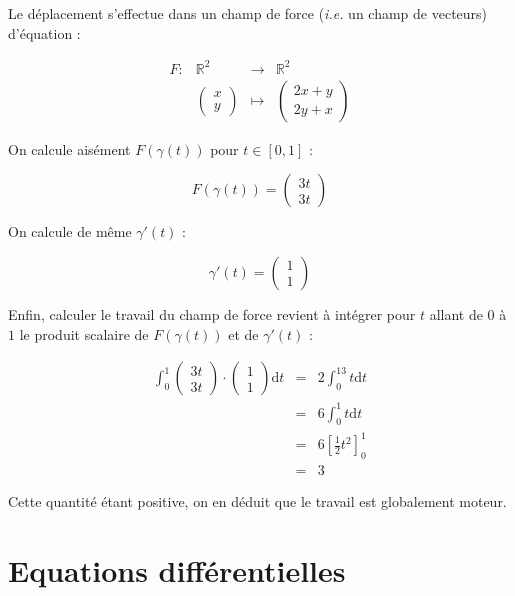 \documentclass[a4paper, 11pt]{report} %
\newcommand{\dt}{\mathrm{d}t}
\newcommand{\R}{\mathbb{R}}
\renewcommand{\mapsto}{\longmapsto}
\begin{document}
Le déplacement s'effectue dans un champ de force (\textit{i.e.} un champ de vecteurs) d'équation :

\[
\begin{array}{llll}
    F : & \R^2 & \longrightarrow & \R^2\\
    & \begin{pmatrix}
        x\\
        y
      \end{pmatrix} & \mapsto &
      \begin{pmatrix}
        2x+y\\
        2y+x
      \end{pmatrix}
\end{array}
\]

On calcule aisément $F(\gamma(t))$ pour $t\in[0,1]$ :

\[
F(\gamma(t)) = \begin{pmatrix}
3t\\
3t
\end{pmatrix}
\]

On calcule de même $\gamma'(t)$ :

\[
\gamma'(t) = \begin{pmatrix}
1\\
1
\end{pmatrix}
\]

Enfin, calculer le travail du champ de force revient à intégrer pour $t$ allant de $0$ à $1$ le produit scalaire de
$F(\gamma(t))$ et de $\gamma'(t)$ :

\begin{eqnarray*}
    \int_0^1
    \begin{pmatrix}
    3t\\
    3t
    \end{pmatrix}
    \cdot
    \begin{pmatrix}
    1\\
    1
    \end{pmatrix}
    \dt
    & = & 2\int_0^13t\dt\\
    & = & 6\int_0^1t\dt\\
    & = & 6\left[\frac{1}{2}t^2\right]_0^1\\
    & = & 3
\end{eqnarray*}

Cette quantité étant positive, on en déduit que le travail est globalement moteur.

\section{Equations différentielles} %
\end{document}
